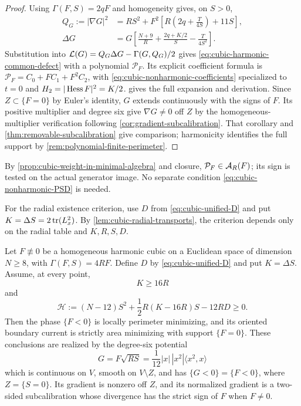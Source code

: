 \begin{proof}
Using \(\Gamma(F,S)=2qF\) and homogeneity gives, on \(S>0\),
\begin{align}
 Q_G:=|\nabla G|^2
 &=RS^2+F^2\left[R\left(2q+\frac{T}{4S}\right)+11S\right],
 \label{eq:cubic-harmonic-common-gradient}\\
 \Delta G
 &=G\left[\frac{N+9}{R}+\frac{2q+K/2}{S}
                         -\frac{T}{4S^2}\right].
 \label{eq:cubic-harmonic-common-laplacian}
\end{align}
Substitution into \(\mathcal L(G)=Q_G\Delta G-\Gamma(G,Q_G)/2\)
gives \eqref{eq:cubic-harmonic-common-defect} with a polynomial
\(\mathcal P_F\). Its explicit coefficient formula is
\(\mathcal P_F=C_0+FC_1+F^2C_2\), with
\eqref{eq:cubic-nonharmonic-coefficients} specialized to
\(t=0\) and \(H_2=|\operatorname{Hess} F|^2=K/2\).
 gives the full expansion
and derivation.
Since \(Z\subset\{F=0\}\) by Euler's identity, \(G\) extends
continuously with the signs of \(F\). Its positive multiplier and degree
six give \(\nabla G\ne0\) off \(Z\) by the homogeneous-multiplier
verification following \cref{cor:gradient-subcalibration}.
That corollary and \cref{thm:removable-subcalibration} give comparison;
harmonicity identifies the full support by
\cref{rem:polynomial-finite-perimeter}.
\end{proof}

By \cref{prop:cubic-weight-in-minimal-algebra} and closure,
\(\mathcal P_F\in\mathcal A_R(F)\); its sign is tested on the actual generator
image. No separate condition \eqref{eq:cubic-nonharmonic-PSD} is needed.

For the radial existence criterion, use \(D\) from
\eqref{eq:cubic-unified-D} and put \(K=\Delta S=2\operatorname{tr}(L_x^2)\).
By \cref{lem:cubic-radial-transports}, the criterion depends only
on the radial table and \(K,R,S,D\).

\begin{theorem}
\label{thm:cubic-unified-sextic}
Let \(F\not\equiv0\) be a homogeneous harmonic cubic on a Euclidean
space of dimension \(N\ge8\), with \(\Gamma(F,S)=4RF\). Define \(D\)
by \eqref{eq:cubic-unified-D} and put \(K=\Delta S\).
Assume, at every point,
\begin{equation}\label{eq:cubic-unified-trace-bound}
 K\ge16R
\end{equation}
and
\begin{equation}\label{eq:cubic-unified-H}
 \mathscr H:=(N-12)S^2+\frac12R(K-16R)S-12RD\ge0.
\end{equation}
Then the phase \(\{F<0\}\) is locally perimeter minimizing, and its
oriented boundary current is strictly area minimizing with support
\(\{F=0\}\). These conclusions are realized by the degree-six potential
\[
 G=F\sqrt{RS}
   =\frac1{12}|x|\,|x^2|\langle x^2,x\rangle
\]
which is continuous on \(V\), smooth on \(V\setminus Z\), and has
\(\{G<0\}=\{F<0\}\), where \(Z=\{S=0\}\).
Its gradient is nonzero off \(Z\), and its normalized gradient is a
two-sided subcalibration whose divergence has the strict sign of \(F\)
when \(F\ne0\).
\end{theorem}

